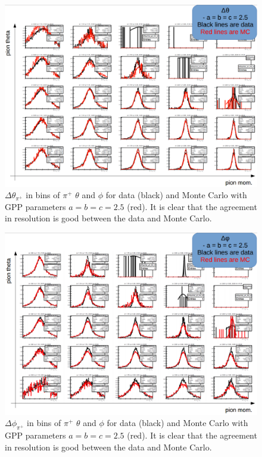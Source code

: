 %
\begin{figure}
\centering
\includegraphics[width=8.5in]{figures/DeltaThetaRes_dataAndMC.png}
\caption{$\Delta \theta_{\pi^+}$ in bins of $\pi^+$ $\theta$ and $\phi$ for data (black) and Monte Carlo with GPP parameters $a = b = c = 2.5$ (red). It is clear that the agreement in resolution is good between the data and Monte Carlo.}
\label{fig:DeltaThetaRes_dataAndMC}
\end{figure}
%
\begin{figure}
\centering
\includegraphics[width=8.5in]{figures/DeltaPhiRes_dataAndMC.png}
\caption{$\Delta \phi_{\pi^+}$ in bins of $\pi^+$ $\theta$ and $\phi$ for data (black) and Monte Carlo with GPP parameters $a = b = c = 2.5$ (red). It is clear that the agreement in resolution is good between the data and Monte Carlo.}
\label{fig:DeltaPhiRes_dataAndMC}
\end{figure}
%

